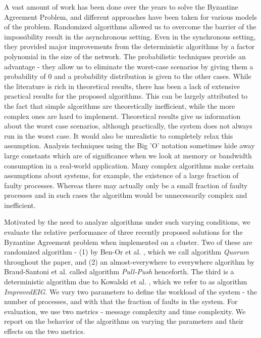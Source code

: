 A vast amount of work has been done over the years to solve the Byzantine Agreement Problem, and different approaches have been taken for various models of the problem. Randomized algorithms allowed us to overcome the barrier of the impossibility result in the asynchronous setting. Even in the synchronous setting, they provided major improvements from the deterministic algorithms by a factor polynomial in the size of the network. The probabilistic techniques provide an advantage - they allow us to eliminate the worst-case scenarios by giving them a probability of $0$ and a probability distribution is given to the other cases. While the literature is rich in theoretical results, there has been a lack of extensive practical results for the proposed algorithms. This can be largely attributed to the fact that simple algorithms are theoretically inefficient, while the more complex ones are hard to implement. Theoretical results give us information about the worst case scenarios, although practically, the system does not always run in the worst case. It would also be unrealistic to completely relax this assumption. Analysis techniques using the Big 'O' notation sometimes hide away large constants which are of significance when we look at memory or bandwidth consumption in a real-world application. Many complex algorithms make certain assumptions about systems, for example, the existence of a large fraction of faulty processes. Whereas there may actually only be a small fraction of faulty processes and in such cases the algorithm would be unnecessarily complex and inefficient.

Motivated by the need to analyze algorithms under such varying conditions, we evaluate the relative performance of three recently proposed solutions for the Byzantine Agreement problem when implemented on a cluster. Two of these are randomized algorithm - (1) by Ben-Or et al. \cite{BPV06}, which we call algorithm \textit{Quorum} throughout the paper, and (2) an almost-everywhere to everywhere algorithm by Braud-Santoni et al. \cite{BGH13} called algorithm \textit{Pull-Push} henceforth. The third is a deterministic algorithm due to Kowalski et al. \cite{KM13}, which we refer to as algorithm \textit{ImprovedEIG}. We vary two parameters to define the workload of the system - the number of processes, and with that the fraction of faults in the system. For evaluation, we use two metrics - message complexity and time complexity. We report on the behavior of the algorithms on varying the parameters and their effects on the two metrics. 

